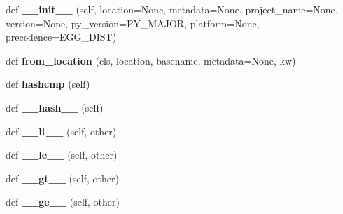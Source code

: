 \begin{DoxyCompactItemize}
\item 
\mbox{\label{classpkg__resources_1_1_distribution_af4cf119ffe7fc00fceb8409576da4515}} 
def {\bfseries \+\_\+\+\_\+init\+\_\+\+\_\+} (self, location=None, metadata=None, project\+\_\+name=None, version=None, py\+\_\+version=P\+Y\+\_\+\+M\+A\+J\+OR, platform=None, precedence=E\+G\+G\+\_\+\+D\+I\+ST)
\item 
\mbox{\label{classpkg__resources_1_1_distribution_a7db6e534e7f8c78b8b3c5f7ddf7140e7}} 
def {\bfseries from\+\_\+location} (cls, location, basename, metadata=None, kw)
\item 
\mbox{\label{classpkg__resources_1_1_distribution_a16b94190b3911d7be073c9a473ea7ba7}} 
def {\bfseries hashcmp} (self)
\item 
\mbox{\label{classpkg__resources_1_1_distribution_a719236d2f5d14307bfeb2a938c0189f8}} 
def {\bfseries \+\_\+\+\_\+hash\+\_\+\+\_\+} (self)
\item 
\mbox{\label{classpkg__resources_1_1_distribution_ab148ba7f4c9a47f11cac36e459757602}} 
def {\bfseries \+\_\+\+\_\+lt\+\_\+\+\_\+} (self, other)
\item 
\mbox{\label{classpkg__resources_1_1_distribution_ad2180c10395605c21a866120be4f9429}} 
def {\bfseries \+\_\+\+\_\+le\+\_\+\+\_\+} (self, other)
\item 
\mbox{\label{classpkg__resources_1_1_distribution_a8ec8b515a344963d6d4e6ee613e3a52a}} 
def {\bfseries \+\_\+\+\_\+gt\+\_\+\+\_\+} (self, other)
\item 
\mbox{\label{classpkg__resources_1_1_distribution_afb04dbdaaa0e0bacfd91096c96f53d7e}} 
def {\bfseries \+\_\+\+\_\+ge\+\_\+\+\_\+} (self, other)
\item 
\mbox{\label{classpkg__resources_1_1_distribution_a93748efe590a957435e081257500f139}} 

\end{DoxyCompactItemize}
